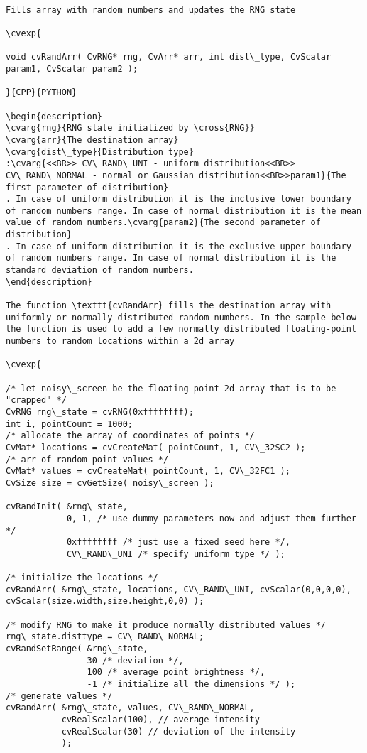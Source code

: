\begin{verbatim}

Fills array with random numbers and updates the RNG state

\cvexp{

void cvRandArr( CvRNG* rng, CvArr* arr, int dist\_type, CvScalar param1, CvScalar param2 );

}{CPP}{PYTHON}

\begin{description}
\cvarg{rng}{RNG state initialized by \cross{RNG}}
\cvarg{arr}{The destination array}
\cvarg{dist\_type}{Distribution type}
:\cvarg{<<BR>> CV\_RAND\_UNI - uniform distribution<<BR>> CV\_RAND\_NORMAL - normal or Gaussian distribution<<BR>>param1}{The first parameter of distribution}
. In case of uniform distribution it is the inclusive lower boundary of random numbers range. In case of normal distribution it is the mean value of random numbers.\cvarg{param2}{The second parameter of distribution}
. In case of uniform distribution it is the exclusive upper boundary of random numbers range. In case of normal distribution it is the standard deviation of random numbers.
\end{description}

The function \texttt{cvRandArr} fills the destination array with uniformly or normally distributed random numbers. In the sample below the function is used to add a few normally distributed floating-point numbers to random locations within a 2d array

\cvexp{

/* let noisy\_screen be the floating-point 2d array that is to be "crapped" */
CvRNG rng\_state = cvRNG(0xffffffff);
int i, pointCount = 1000;
/* allocate the array of coordinates of points */
CvMat* locations = cvCreateMat( pointCount, 1, CV\_32SC2 );
/* arr of random point values */
CvMat* values = cvCreateMat( pointCount, 1, CV\_32FC1 );
CvSize size = cvGetSize( noisy\_screen );

cvRandInit( &rng\_state,
            0, 1, /* use dummy parameters now and adjust them further */
            0xffffffff /* just use a fixed seed here */,
            CV\_RAND\_UNI /* specify uniform type */ );

/* initialize the locations */
cvRandArr( &rng\_state, locations, CV\_RAND\_UNI, cvScalar(0,0,0,0), cvScalar(size.width,size.height,0,0) );

/* modify RNG to make it produce normally distributed values */
rng\_state.disttype = CV\_RAND\_NORMAL;
cvRandSetRange( &rng\_state,
                30 /* deviation */,
                100 /* average point brightness */,
                -1 /* initialize all the dimensions */ );
/* generate values */
cvRandArr( &rng\_state, values, CV\_RAND\_NORMAL,
           cvRealScalar(100), // average intensity
           cvRealScalar(30) // deviation of the intensity
           );


\end{verbatim}
